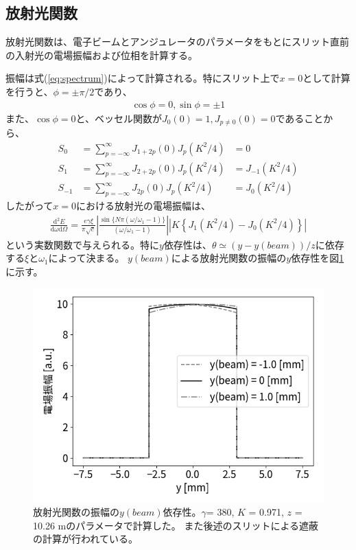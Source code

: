 \documentclass[a4paper,11pt,uplatex]{jsbook}
\begin{document}
\subsection{放射光関数}
放射光関数は、電子ビームとアンジュレータのパラメータをもとにスリット直前の入射光の電場振幅および位相を計算する。

振幅は式(\ref{eq:spectrum})によって計算される。特にスリット上で$x=0$として計算を行うと、$\phi = \pm\pi/2$であり、 
\begin{align}
  \cos \phi = 0, \sin \phi = \pm 1
\end{align}
また、$\cos \phi = 0$と、ベッセル関数が$J_0(0) = 1, J_{p\ne 0}(0) = 0$であることから、
\begin{align}
  S_0 &= \sum_{p = -\infty}^{\infty} J_{1+2p}(0)J_p(K^2/4)  &= 0 \\
  S_1 &= \sum_{p = -\infty}^{\infty} J_{2+2p}(0)J_p(K^2/4)  &=  J_{-1}(K^2/4)\\
  S_{-1} &= \sum_{p = -\infty}^{\infty} J_{2p}(0)J_p(K^2/4) &= J_0(K^2/4)
\end{align}
したがって$x=0$における放射光の電場振幅は、
\begin{align}
  \frac{\text{d}^2E}{\text{d}\omega \text{d}\Omega} = \frac{e\gamma\xi}{\pi \sqrt{c}}\left| \frac{\sin \{N\pi(\omega/\omega_1 -1)\}}{(\omega/\omega_1 -1)} \right|
  \left| K\left\{ J_1(K^2/4) - J_0(K^2/4) \right\} \right|
\end{align}
という実数関数で与えられる。特に$y$依存性は、$\theta \simeq (y -y(beam))/ z$に依存する$\xi$と$\omega_1$によって決まる。
$y(beam)$による放射光関数の振幅の$y$依存性を図\ref{fig:ybeam}に示す。
\begin{figure}[h]
  \centering
  \includegraphics[width = 0.8\linewidth]{image/2-ybeam.png}
  \caption[放射光関数のビーム位置依存性]{放射光関数の振幅の$y(beam)$依存性。$\gamma$= 380, $K$ = 0.971, $z$ = 10.26 mのパラメータで計算した。
  また後述のスリットによる遮蔽の計算が行われている。}
  \label{fig:ybeam}
\end{figure}
\end{document}
